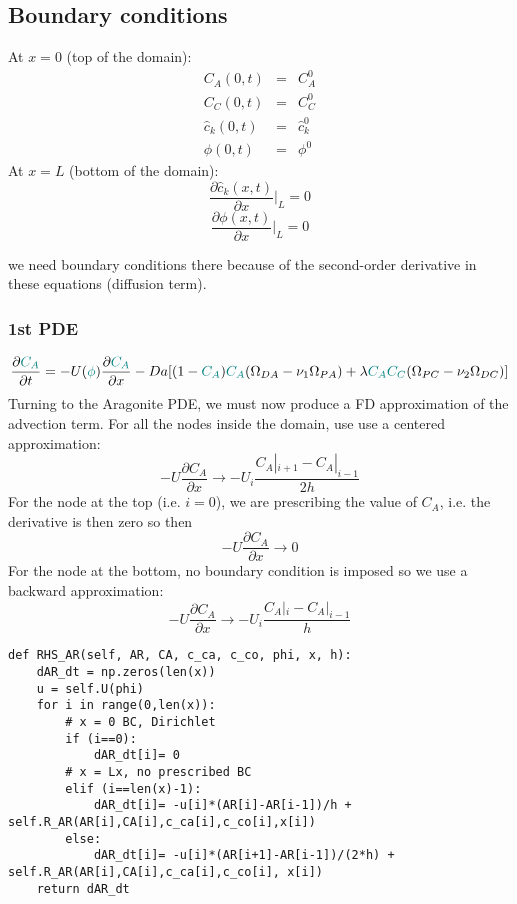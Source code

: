 \documentclass[a4paper]{article}
\begin{document}
\subsection*{Boundary conditions}

At $x=0$ (top of the domain):
\begin{eqnarray}
C_A(0,t)&=&C_{A}^0 \\
C_C(0,t)&=&C_{C}^0 \\
\hat{c}_k(0,t)&=&\hat{c}_{k}^0 \\
\phi(0,t) &=& \phi^0
\end{eqnarray}
At $x=L$ (bottom of the domain):
\[
\frac{\partial \hat{c}_k (x,t)}{\partial x}|_L = 0
\]
\[
\frac{\partial \phi (x,t)}{\partial x}|_L = 0
\]

we need boundary conditions there because of the second-order 
derivative in these equations (diffusion term).


\subsubsection*{1st PDE}

\[
\frac{\partial {\color{teal} C_A}}{\partial t} 
= -U({\color{teal}\phi}) \frac{\partial {\color{teal}C_A}}{\partial x} 
- Da[(1-{\color{teal}C_A}){\color{teal}C_A}(\Omega_{DA}-\nu_1\Omega_{PA})+
\lambda {\color{teal}C_AC_C} (\Omega_{PC}-\nu_2\Omega_{DC})]
\]
Turning to the Aragonite PDE, we must now produce a FD approximation of the advection term.
For all the nodes inside the domain, use use a centered approximation:
\[
-U \frac{\partial C_A}{\partial x} \rightarrow -U_i \frac{C_A|_{i+1} -C_A|_{i-1}}{2h}
\]
For the node at the top (i.e. $i=0$), we are prescribing the value of $C_A$, i.e.
the derivative is then zero so then 
\[
-U \frac{\partial C_A}{\partial x} \rightarrow 0 
\]
For the node at the bottom, no boundary condition is imposed so we use a backward
approximation:
\[
-U \frac{\partial C_A}{\partial x} \rightarrow -U_i \frac{C_A|_{i} -C_A|_{i-1}}{h}
\]
 
\begin{lstlisting}
def RHS_AR(self, AR, CA, c_ca, c_co, phi, x, h):
    dAR_dt = np.zeros(len(x))
    u = self.U(phi)
    for i in range(0,len(x)):
        # x = 0 BC, Dirichlet
        if (i==0):
            dAR_dt[i]= 0
        # x = Lx, no prescribed BC
        elif (i==len(x)-1):
            dAR_dt[i]= -u[i]*(AR[i]-AR[i-1])/h + self.R_AR(AR[i],CA[i],c_ca[i],c_co[i],x[i])
        else:
            dAR_dt[i]= -u[i]*(AR[i+1]-AR[i-1])/(2*h) + self.R_AR(AR[i],CA[i],c_ca[i],c_co[i], x[i])    
    return dAR_dt
\end{lstlisting}
\end{document}
